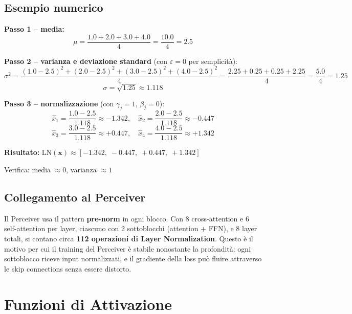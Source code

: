 \documentclass[
  11pt,
]{article}
\begin{document}
\subsection{Esempio numerico}

\begin{notabox}[title={\textbf{Esempio: $\mathbf{x} = [1.0,\;2.0,\;3.0,\;4.0]$, $D=4$}}]
\textbf{Passo 1 -- media:}
\[
\mu = \frac{1.0 + 2.0 + 3.0 + 4.0}{4} = \frac{10.0}{4} = 2.5
\]

\textbf{Passo 2 -- varianza e deviazione standard} (con $\varepsilon = 0$ per semplicità):
\[
\sigma^2 = \frac{(1.0-2.5)^2 + (2.0-2.5)^2 + (3.0-2.5)^2 + (4.0-2.5)^2}{4}
= \frac{2.25 + 0.25 + 0.25 + 2.25}{4} = \frac{5.0}{4} = 1.25
\]
\[
\sigma = \sqrt{1.25} \approx 1.118
\]

\textbf{Passo 3 -- normalizzazione} (con $\gamma_j = 1$, $\beta_j = 0$):
\[
\hat{x}_1 = \frac{1.0 - 2.5}{1.118} \approx -1.342, \quad
\hat{x}_2 = \frac{2.0 - 2.5}{1.118} \approx -0.447
\]
\[
\hat{x}_3 = \frac{3.0 - 2.5}{1.118} \approx +0.447, \quad
\hat{x}_4 = \frac{4.0 - 2.5}{1.118} \approx +1.342
\]

\textbf{Risultato:} $\text{LN}(\mathbf{x}) \approx [-1.342,\;-0.447,\;+0.447,\;+1.342]$

Verifica: media $\approx 0$, varianza $\approx 1$ \checkmark
\end{notabox}

\subsection{Collegamento al Perceiver}

\begin{notabox}[title={\textbf{Layer Normalization nel Perceiver IO}}]
Il Perceiver usa il pattern \textbf{pre-norm} in ogni blocco. Con 8 cross-attention e 6 self-attention per layer, ciascuno con 2 sottoblocchi (attention + FFN), e 8 layer totali, si contano circa \textbf{112 operazioni di Layer Normalization}. Questo è il motivo per cui il training del Perceiver è stabile nonostante la profondità: ogni sottoblocco riceve input normalizzati, e il gradiente della loss può fluire attraverso le skip connections senza essere distorto.
\end{notabox}

\section{Funzioni di Attivazione}
\label{app:activations}
\end{document}

